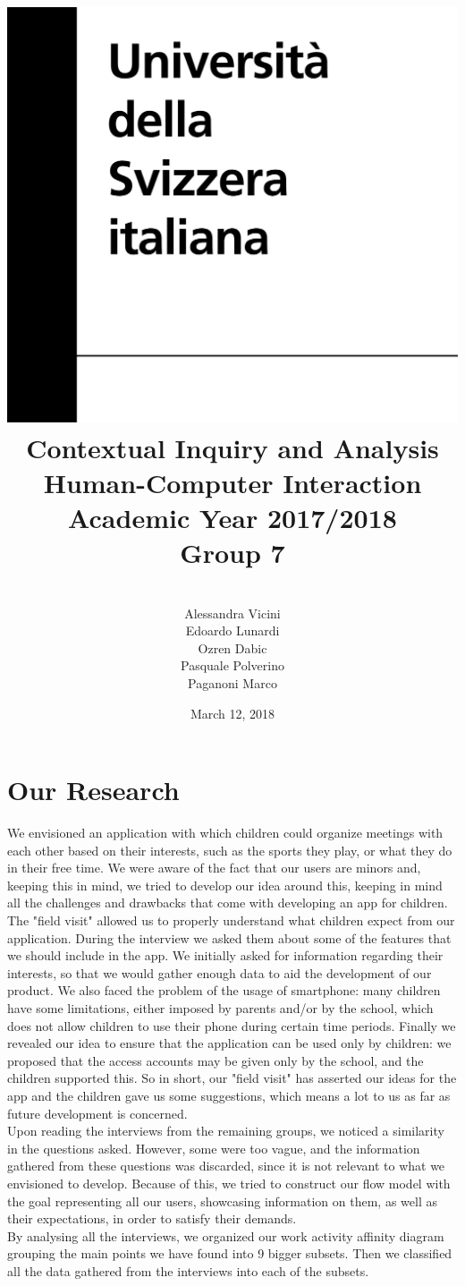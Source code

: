 \documentclass[12pt]{report}
\title {
	\includegraphics[width = .2\linewidth]{University-of-Lugano.png} \break \break
	{\bf\Huge Contextual Inquiry and Analysis}
	\\\large Human-Computer Interaction
	\\\small Academic Year 2017/2018 \break
	\\\large \textbf{Group 7}}
\author{
	\\\large Alessandra Vicini \\ Edoardo Lunardi \\ Ozren Dabic \\ Pasquale Polverino \\ Paganoni Marco}
\date{March 12, 2018}
\begin{document}
	\pagestyle{empty}
	\maketitle
	\section*{\huge Our Research}
	We envisioned an application with which children could organize meetings
	with each other based on their interests, such as the sports they play, 
	or what they do in their free time. We were aware of the fact 
	that our users are minors and, keeping this in mind, we tried to develop 
	our idea around this, keeping in mind all the challenges and drawbacks 
	that come with developing an app for children. The "field visit" allowed us to properly
	understand what children expect from our application. During the interview we asked
	them about some of the features that we should include in the app. 
	We initially asked for information regarding their interests, so that
	we would gather enough data to aid the development of our product. 
	We also faced the problem of the usage of smartphone: many children have some limitations, either
	imposed by parents and/or by the school, which does not allow children
	to use their phone during certain time periods. Finally we revealed our idea to
	ensure that the application can be used only by children: we
	proposed that the access accounts may be given only by the school, and the
	children supported this. So in short, our "field visit" has
	asserted our ideas for the app and the children gave us some suggestions,
	which means a lot to us as far as future development is concerned.\\

	Upon reading the interviews from the remaining groups, we noticed 
	a similarity in the questions asked. However, some were too vague, 
	and the information gathered from these questions was discarded, 
	since it is not relevant to what we envisioned to develop. 
	Because of this, we tried to construct our flow model with the goal 
	representing all our users, showcasing information on them, 
	as well as their expectations, in order to satisfy their demands.\\

	By analysing all the interviews, we organized our work activity affinity diagram 
	grouping the main points we have found into 9 bigger subsets. 
	Then we classified all the data gathered from the interviews into each of the subsets. 
	
\end{document}
